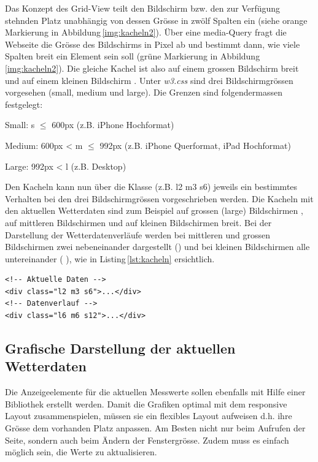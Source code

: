 \noindent
Das Konzept des Grid-View teilt den Bildschirm bzw. den zur Verfügung stehnden Platz unabhängig von dessen Grösse in zwölf Spalten ein (siehe orange Markierung in Abbildung\,\ref{img:kacheln2}). Über eine media-Query fragt die Webseite die Grösse des Bildschirms in Pixel ab und bestimmt dann, wie viele Spalten breit ein Element sein soll (grüne Markierung in Abbildung\,\ref{img:kacheln2}). Die gleiche Kachel ist also auf einem grossen Bildschirm   breit und auf einem kleinen Bildschirm . Unter \emph{w3.css} sind drei Bildschirmgrössen vorgesehen (small, medium und large). Die Grenzen sind folgendermassen festgelegt:

\begin{itemize*}
\item Small: s $\leq$ 600px (z.B. iPhone Hochformat)
\item Medium: 600px < m $\leq$ 992px (z.B. iPhone Querformat, iPad Hochformat)
\item Large: 992px < l (z.B. Desktop)
\end{itemize*}

\noindent
Den Kacheln kann nun über die Klasse (z.B. l2 m3 s6) jeweils ein bestimmtes Verhalten bei den drei Bildschirmgrössen vorgeschrieben werden. Die Kacheln mit den aktuellen Wetterdaten sind zum Beispiel auf grossen (large) Bildschirmen , auf mittleren Bildschirmen  und auf kleinen Bildschirmen  breit. Bei der Darstellung der Wetterdatenverläufe werden bei mittleren und grossen Bildschirmen zwei nebeneinander dargestellt () und bei kleinen Bildschirmen alle untereinander ( ), wie in Listing\,\ref{lst:kacheln} ersichtlich.

\vspace{3mm}
\begin{lstlisting}[label=lst:kacheln,caption=Konfiguration der Anzahl Kacheln abhähngig von der Bildschirmgrösse, language=HTML5, style=htmlcssjs]
<!-- Aktuelle Daten -->
<div class="l2 m3 s6">...</div>
<!-- Datenverlauf -->
<div class="l6 m6 s12">...</div>
\end{lstlisting}
\vspace{3mm}

\subsection{Grafische Darstellung der aktuellen Wetterdaten}
Die Anzeigeelemente für die aktuellen Messwerte sollen ebenfalls mit Hilfe einer Bibliothek erstellt werden. Damit die Grafiken optimal mit dem responsive Layout zusammenspielen, müssen sie ein flexibles Layout aufweisen d.h. ihre Grösse dem vorhanden Platz anpassen. Am Besten nicht nur beim Aufrufen der Seite, sondern auch beim Ändern der Fenstergrösse. Zudem muss es einfach möglich sein, die Werte zu aktualisieren.

